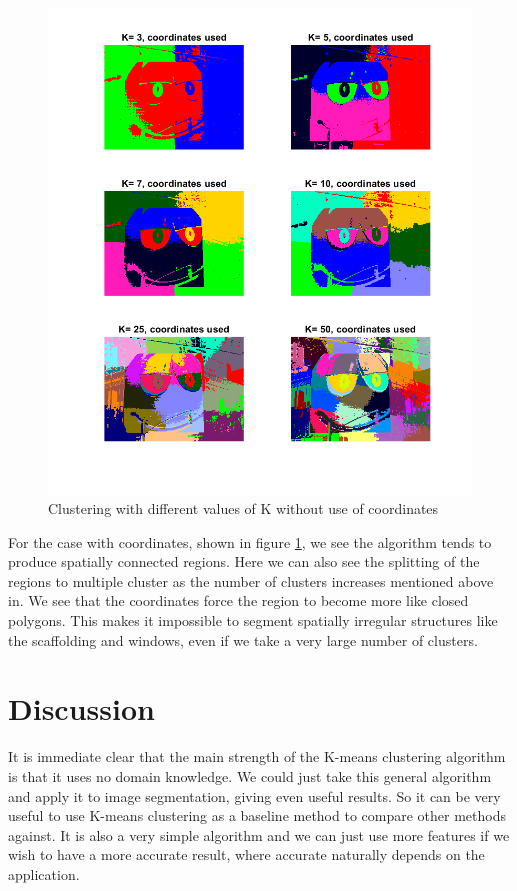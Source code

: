 \begin{figure}[h!]
\centering
\includegraphics[width =0.8\linewidth]{figures/task2/mm_coords_manyK.png}
\caption{Clustering with different values of K without use of coordinates}
\label{fig:mm:coords:manyK}
\end{figure}

For the case with coordinates, shown in figure \ref{fig:mm:coords:manyK}, we see the algorithm tends to produce spatially connected regions. Here we can also see the splitting of the regions to multiple cluster as the number of clusters increases mentioned above in. We see that the coordinates force the region to become more like closed polygons. This makes it impossible to segment spatially irregular structures like the scaffolding and windows, even if we take a very large number of clusters. 

\section{Discussion}
It is immediate clear that the main strength of the K-means clustering algorithm is that it uses no domain knowledge. We could just take this general algorithm and apply it to image segmentation, giving even useful results. So it can be very useful to use K-means clustering as a baseline method to compare other methods against. It is also a very simple algorithm and we can just use more features if we wish to have a more accurate result, where accurate naturally depends on the application.

